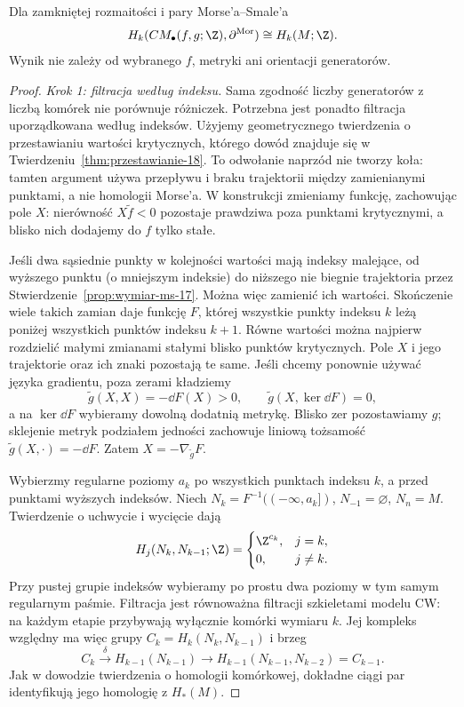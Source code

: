 \begin{twierdzenie}
\label{thm:homologia-morse-17}
Dla zamkniętej rozmaitości
i pary Morse'a--Smale'a
\[
 H_k(CM_\bullet(f,g;\Z),
          \partial^{\mathrm{Mor}})
       \cong H_k(M;\Z).
\]
Wynik nie zależy od
wybranego $f$, metryki
ani orientacji generatorów.
\end{twierdzenie}
\begin{proof}
\emph{Krok 1: filtracja według indeksu.}
Sama zgodność liczby generatorów z liczbą komórek
nie porównuje różniczek. Potrzebna jest ponadto
filtracja uporządkowana według indeksów.
Użyjemy geometrycznego twierdzenia o przestawianiu
wartości krytycznych, którego dowód znajduje się
w Twierdzeniu~\ref{thm:przestawianie-18}.
To odwołanie naprzód nie tworzy koła: tamten argument
używa przepływu i braku trajektorii między zamienianymi
punktami, a nie homologii Morse'a.
W konstrukcji zmieniamy funkcję, zachowując pole $X$:
nierówność $X\widetilde f<0$ pozostaje prawdziwa
poza punktami krytycznymi, a blisko nich dodajemy
do $f$ tylko stałe.

Jeśli dwa sąsiednie punkty w kolejności wartości
mają indeksy malejące, od wyższego punktu
(o mniejszym indeksie) do niższego nie biegnie
trajektoria przez Stwierdzenie~\ref{prop:wymiar-ms-17}.
Można więc zamienić ich wartości. Skończenie wiele
takich zamian daje funkcję $F$, której wszystkie
punkty indeksu $k$ leżą poniżej wszystkich punktów
indeksu $k+1$. Równe wartości można najpierw rozdzielić
małymi zmianami stałymi blisko punktów krytycznych.
Pole $X$ i jego trajektorie oraz ich znaki pozostają te same.
Jeśli chcemy ponownie używać języka gradientu,
poza zerami kładziemy
\[
 \widetilde g(X,X)=-\dd F(X)>0,\qquad
 \widetilde g(X,\ker\dd F)=0,
\]
a na $\ker\dd F$ wybieramy dowolną dodatnią metrykę.
Blisko zer pozostawiamy $g$; sklejenie metryk podziałem
jedności zachowuje liniową tożsamość
$\widetilde g(X,\cdot)=-\dd F$.
Zatem $X=-\nabla_{\widetilde g}F$.

Wybierzmy regularne poziomy $a_k$ po wszystkich
punktach indeksu $k$, a przed punktami wyższych indeksów.
Niech $N_k=F^{-1}(( -\infty,a_k])$,
$N_{-1}=\varnothing$, $N_n=M$.
Twierdzenie o uchwycie i wycięcie dają
\[
 H_j(N_k,N_{k-1};\Z)=
 \begin{cases}\Z^{c_k},&j=k,\\0,&j\ne k.\end{cases}
\]
Przy pustej grupie indeksów wybieramy po prostu
dwa poziomy w tym samym regularnym paśmie.
Filtracja jest równoważna filtracji szkieletami
modelu CW: na każdym etapie przybywają wyłącznie
komórki wymiaru $k$. Jej kompleks względny ma więc
grupy $C_k=H_k(N_k,N_{k-1})$ i brzeg
\[
 C_k\xrightarrow{\delta}H_{k-1}(N_{k-1})
       \longrightarrow H_{k-1}(N_{k-1},N_{k-2})=C_{k-1}.
\]
Jak w dowodzie twierdzenia o homologii komórkowej,
dokładne ciągi par identyfikują jego homologię z $H_*(M)$.


\end{proof}
